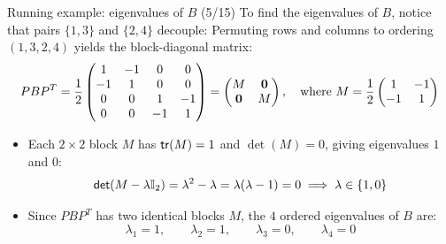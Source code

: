 \documentclass[aspectratio=169]{beamer}\usepackage[]{graphicx}\usepackage[]{xcolor}
\begin{document}
\begin{frame}{Running example: eigenvalues of $B$ (5/15)}
To find the eigenvalues of $B$, notice that pairs $\{1, 3\}$ and $\{2, 4\}$ decouple:
\vfill
Permuting rows and columns to ordering $(1, 3, 2, 4)$ yields the block-diagonal matrix:
\[
P B P^T = \frac{1}{2}\begin{pmatrix}
1 & -1 & 0 & 0 \\
-1 & 1 & 0 & 0 \\
0 & 0 & 1 & -1 \\
0 & 0 & -1 & 1
\end{pmatrix}
= \begin{pmatrix}
M & \b0 \\
\b0 & M
\end{pmatrix},
\quad\text{where } M = \frac{1}{2}\begin{pmatrix} 1 & -1 \\ -1 & 1 \end{pmatrix}
\]
\vfill
\begin{itemize}
\item Each $2\times 2$ block $M$ has $\mathsf{tr}(M) = 1$ and $\det(M) = 0$, giving eigenvalues $1$ and $0$:
\[
\mathsf{det}(M - \lambda\mathbb{I}_2) = \lambda^2 - \lambda = \lambda(\lambda - 1) = 0 \implies \lambda \in \{1, 0\}
\]
\item Since $PBP^T$ has two identical blocks $M$, the $4$ ordered eigenvalues of $B$ are:
\[
\lambda_1 = 1, \qquad \lambda_2 = 1, \qquad \lambda_3 = 0, \qquad \lambda_4 = 0
\]
\end{itemize}
\end{frame}
\end{document}
